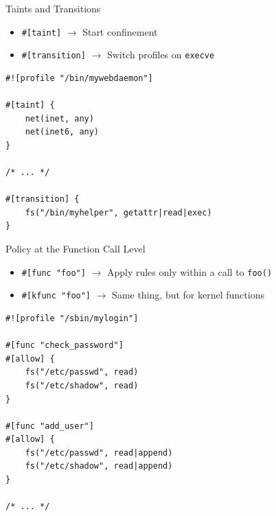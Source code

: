 \documentclass[12pt, dvipsnames, aspectratio=169]{beamer}
\begin{document}
\begin{frame}[c, fragile]{Taints and Transitions}
\begin{itemize}
    \item \lstinline[language=bpfbox]|#[taint]|  $\rightarrow$ Start confinement
    \item \lstinline[language=bpfbox]|#[transition]|  $\rightarrow$ Switch profiles on \texttt{execve}
\end{itemize}
\vfill
\begin{lstlisting}[language=bpfbox, xleftmargin=.25\textwidth]
#![profile "/bin/mywebdaemon"]

#[taint] {
    net(inet, any)
    net(inet6, any)
}

/* ... */

#[transition] {
    fs("/bin/myhelper", getattr|read|exec)
}
\end{lstlisting}
\end{frame}

\begin{frame}[c, fragile]{Policy at the Function Call Level}
\begin{itemize}
    \item \lstinline[language=bpfbox]|#[func "foo"]|  $\rightarrow$ Apply rules only within a call to \texttt{foo()}
    \item \lstinline[language=bpfbox]|#[kfunc "foo"]|  $\rightarrow$ Same thing, but for kernel functions
\end{itemize}
\vfill
\begin{lstlisting}[language=bpfbox, xleftmargin=.25\textwidth]
#![profile "/sbin/mylogin"]

#[func "check_password"]
#[allow] {
    fs("/etc/passwd", read)
    fs("/etc/shadow", read)
}

#[func "add_user"]
#[allow] {
    fs("/etc/passwd", read|append)
    fs("/etc/shadow", read|append)
}

/* ... */
\end{lstlisting}
\end{frame}
\end{document}
